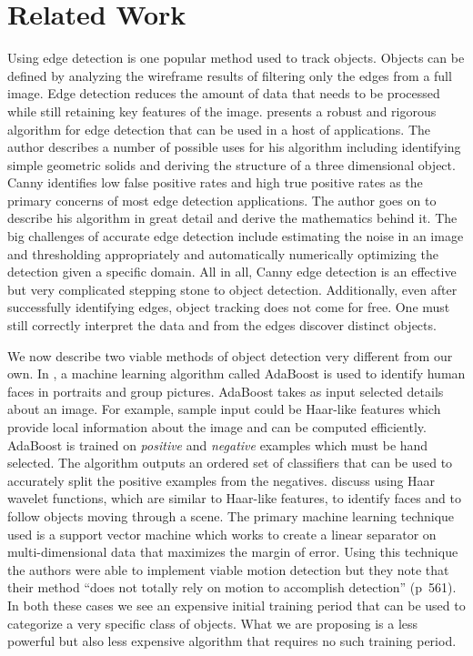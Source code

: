 \documentclass{article}
\renewcommand{\|}{\origbar} %
\begin{document}
\section{Related Work}
\label{sec:relatedWork}

Using edge detection is one popular method used to track objects. Objects can be defined by analyzing the wireframe results of filtering only the edges from a full image. Edge detection reduces the amount of data that needs to be processed while still retaining key features of the image.  presents a robust and rigorous algorithm for edge detection that can be used in a host of applications. The author describes a number of possible uses for his algorithm including identifying simple geometric solids and deriving the structure of a three dimensional object. Canny identifies low false positive rates and high true positive rates as the primary concerns of most edge detection applications. The author goes on to describe his algorithm in great detail and derive the mathematics behind it. The big challenges of accurate edge detection include estimating the noise in an image and thresholding appropriately and automatically numerically optimizing the detection given a specific domain. All in all, Canny edge detection is an effective but very complicated stepping stone to object detection. Additionally, even after successfully identifying edges, object tracking does not come for free. One must still correctly interpret the data and from the edges discover distinct objects.

We now describe two viable methods of object detection very different from our own. In , a machine learning algorithm called AdaBoost is used to identify human faces in portraits and group pictures. AdaBoost takes as input selected details about an image. For example, sample input could be Haar-like features which provide local information about the image and can be computed efficiently. AdaBoost is trained on {\em positive} and {\em negative} examples which must be hand selected. The algorithm outputs an ordered set of classifiers that can be used to accurately split the positive examples from the negatives.  discuss using Haar wavelet functions, which are similar to Haar-like features, to identify faces and to follow objects moving through a scene. The primary machine learning technique used is a support vector machine which works to create a linear separator on multi-dimensional data that maximizes the margin of error. Using this technique the authors were able to implement viable motion detection but they note that their method ``does not totally rely on motion to accomplish detection'' (p~561). In both these cases we see an expensive initial training period that can be used to categorize a very specific class of objects. What we are proposing is a less powerful but also less expensive algorithm that requires no such training period.
\end{document}
